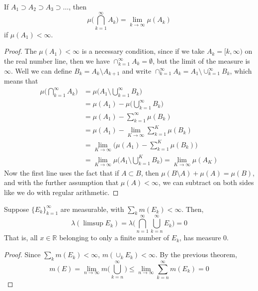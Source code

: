   \begin{theorem}
    If $A_1 \supset A_2 \supset A_3 \supset \ldots$, then 
    \begin{equation}
      \mu\bigg( \bigcap_{k=1}^\infty A_k \bigg) = \lim_{k \rightarrow \infty} \mu(A_k)
    \end{equation}
    if $\mu(A_1) < \infty$. 
  \end{theorem}
  \begin{proof}
    The $\mu(A_1) < \infty$ is a necessary condition, since if we take $A_k = [k, \infty)$ on the real number line, then we have $\cap_{k=1}^\infty A_k = \emptyset$, but the limit of the measure is $\infty$. Well we can define $B_k = A_k \setminus A_{k+1}$ and write $\cap_{k=1}^\infty A_k = A_1 \setminus \cup_{k=1}^\infty B_k$, which means that 
    \begin{align*}
      \mu\bigg( \bigcap_{k=1}^\infty A_k \bigg) & = \mu\bigg( A_1 \setminus \bigcup_{k=1}^\infty B_k \bigg) \\
      & = \mu(A_1) - \mu\bigg( \bigcup_{k=1}^\infty B_k\bigg) \\
      & = \mu(A_1) - \sum_{k=1}^\infty \mu(B_k) \\
      & = \mu(A_1) - \lim_{K \rightarrow \infty} \sum_{k=1}^K \mu(B_k) \\
      & = \lim_{K \rightarrow \infty} \bigg( \mu(A_1) - \sum_{k=1}^K \mu(B_k) \bigg) \\
      & = \lim_{K \rightarrow \infty} \mu \bigg( A_1 \setminus \bigcup_{k=1}^K B_k \bigg) = \lim_{K \rightarrow \infty} \mu(A_K)
    \end{align*}
    Now the first line uses the fact that if $A \subset B$, then $\mu(B \setminus A) + \mu(A) = \mu(B)$, and with the further assumption that $\mu(A) < \infty$, we can subtract on both sides like we do with regular arithmetic. 
  \end{proof}

  \begin{lemma}
    Suppose $\{E_k\}_{k=1}^\infty$ are measurable, with $\sum_{k} m(E_k) < \infty$. Then, 
    \begin{equation}
      \lambda(\limsup E_k) = \lambda \bigg( \bigcap_{n=1}^\infty \bigcup_{k=n}^\infty E_k \bigg) = 0
    \end{equation}
    That is, all $x \in \mathbb{R}$ belonging to only a finite number of $E_k$, has measure $0$. 
  \end{lemma}
  \begin{proof}
    Since $\sum_k m(E_k) < \infty$, $m ( \cup_k E_k) < \infty$. By the previous theorem, 
    \begin{equation}
      m(E) = \lim_{n \to \infty} m \bigg( \bigcup_{k=n}^\infty \bigg) \leq \lim_{n \to \infty} \sum_{k=n}^\infty m(E_k) = 0
    \end{equation}
  \end{proof}


